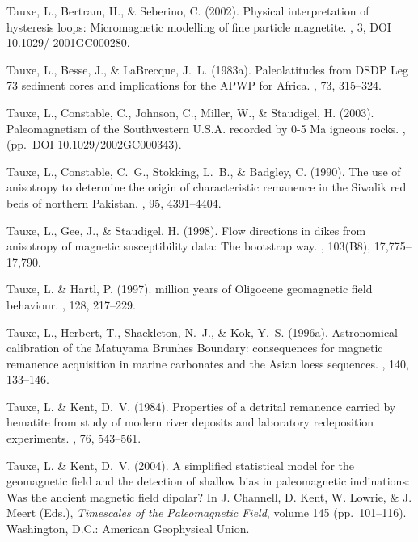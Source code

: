 \documentclass[11pt]{book}
\begin{document}
\begin{thebibliography}{}
Tauxe, L., Bertram, H., \& Seberino, C. (2002).
\newblock Physical interpretation of hysteresis loops: Micromagnetic modelling
  of fine particle magnetite.
, 3, DOI 10.1029/ 2001GC000280.

Tauxe, L., Besse, J., \& LaBrecque, J.~L. (1983a).
\newblock Paleolatitudes from DSDP Leg 73 sediment cores and implications for
  the APWP for Africa.
, 73, 315--324.

Tauxe, L., Constable, C., Johnson, C., Miller, W., \& Staudigel, H. (2003).
\newblock Paleomagnetism of the Southwestern U.S.A. recorded by 0-5 Ma igneous
  rocks.
, (pp.\ DOI 10.1029/2002GC000343).

Tauxe, L., Constable, C.~G., Stokking, L.~B., \& Badgley, C. (1990).
\newblock The use of anisotropy to determine the origin of characteristic
  remanence in the Siwalik red beds of northern Pakistan.
, 95, 4391--4404.

Tauxe, L., Gee, J., \& Staudigel, H. (1998).
\newblock Flow directions in dikes from anisotropy of magnetic susceptibility
  data: The bootstrap way.
, 103(B8), 17,775--17,790.

Tauxe, L. \& Hartl, P. (1997).
 million years of Oligocene geomagnetic field behaviour.
, 128, 217--229.

Tauxe, L., Herbert, T., Shackleton, N.~J., \& Kok, Y.~S. (1996a).
\newblock Astronomical calibration of the Matuyama Brunhes Boundary:
  consequences for magnetic remanence acquisition in marine carbonates and the
  Asian loess sequences.
, 140, 133--146.

Tauxe, L. \& Kent, D.~V. (1984).
\newblock Properties of a detrital remanence carried by hematite from study of
  modern river deposits and laboratory redeposition experiments.
, 76, 543--561.

Tauxe, L. \& Kent, D.~V. (2004).
\newblock A simplified statistical model for the geomagnetic field and the
  detection of shallow bias in paleomagnetic inclinations: Was the ancient
  magnetic field dipolar?
\newblock In J. Channell, D. Kent, W. Lowrie, \& J. Meert (Eds.), {\em
  Timescales of the Paleomagnetic Field}, volume 145  (pp.\ 101--116).
  Washington, D.C.: American Geophysical Union.


\end{thebibliography}
\end{document}
